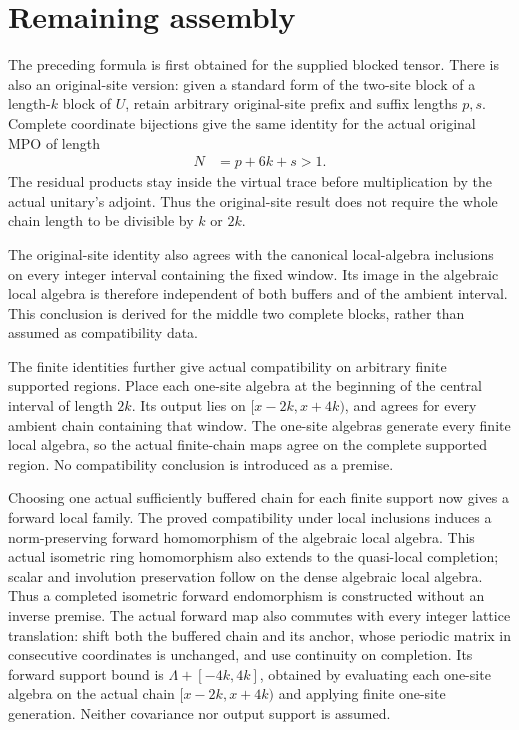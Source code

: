 \documentclass[11pt]{article}
\begin{document}
\section{Remaining assembly}

The preceding formula is first obtained for the supplied blocked tensor.
There is also an original-site version: given a standard form of the
two-site block of a length-$k$ block of $U$, retain arbitrary original-site
prefix and suffix lengths $p,s$. Complete coordinate bijections give the
same identity for the actual original MPO of length
\begin{align}
    N & =p+6k+s>1.
    \label{eq:mpu_qca_original_residual_window_length}
\end{align}
The residual products stay inside the virtual trace before multiplication
by the actual unitary's adjoint. Thus the original-site result does not
require the whole chain length to be divisible by $k$ or $2k$.

The original-site identity also agrees with the canonical local-algebra
inclusions on every integer interval containing the fixed window. Its
image in the algebraic local algebra is therefore independent of both
buffers and of the ambient interval. This conclusion is derived for the
middle two complete blocks, rather than assumed as compatibility data.

The finite identities further give actual compatibility on arbitrary
finite supported regions. Place each one-site algebra at the beginning
of the central interval of length $2k$. Its output lies on
$[x-2k,x+4k)$, and agrees for every ambient chain containing that window.
The one-site algebras generate every finite local algebra, so the actual
finite-chain maps agree on the complete supported region. No
compatibility conclusion is introduced as a premise.

Choosing one actual sufficiently buffered chain for each finite support
now gives a forward local family. The proved compatibility under local
inclusions induces a norm-preserving forward homomorphism of the
algebraic local algebra. This actual isometric ring homomorphism also
extends to the quasi-local completion; scalar and involution preservation
follow on the dense algebraic local algebra. Thus a completed isometric
forward endomorphism is constructed without an inverse premise. The
actual forward map also commutes with every integer lattice translation:
shift both the buffered chain and its anchor, whose periodic matrix in
consecutive coordinates is unchanged, and use continuity on completion.
Its forward support bound is $\Lambda+[-4k,4k]$, obtained by evaluating
each one-site algebra on the actual chain $[x-2k,x+4k)$ and applying
finite one-site generation. Neither covariance nor output support is
assumed.
\end{document}

